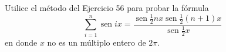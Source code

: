 \item Utilice el método del Ejercicio 56 para probar la fórmula
$$\sum_{i=1}^n \operatorname{sen} ix = \frac{\operatorname{sen} \frac{1}{2}nx \operatorname{sen} \frac{1}{2}(n + 1)x}{\operatorname{sen} \frac{1}{2}x}$$
en donde $x$ no es un múltiplo entero de $2\pi$.
